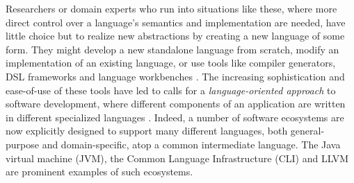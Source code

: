 \documentclass{llncs}
\begin{document}


Researchers or domain experts who run into situations like these, where more direct control over a language's semantics and implementation are needed, have little choice but to realize new abstractions by creating a new language of some form. They might develop a new standalone language from scratch, modify an implementation of an existing language, or use tools like compiler generators, DSL frameworks and language workbenches \cite{fowler2010domain}. 
The increasing sophistication and ease-of-use of these tools have led to calls for a {\it language-oriented approach} to software development, where different components of an application are written in different specialized languages \cite{journals/stp/Ward94}. Indeed, a number of software ecosystems are now explicitly designed to support many different languages, both general-purpose and domain-specific, atop a common intermediate language. The Java virtual machine (JVM), the Common Language Infrastructure (CLI) and LLVM are prominent examples of such ecosystems.
\end{document}
